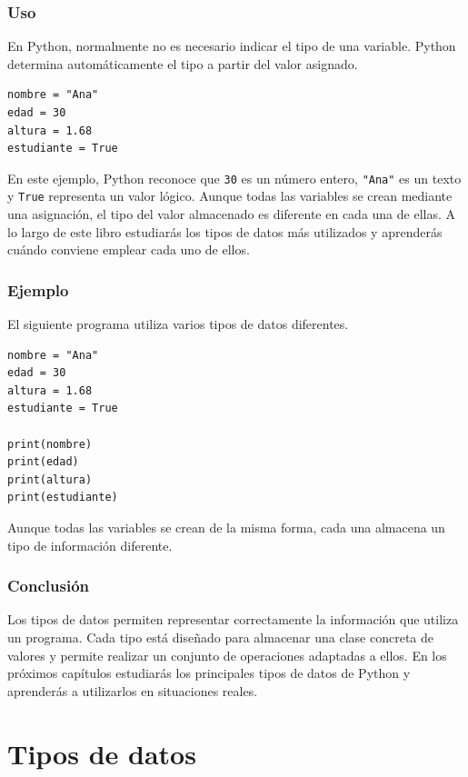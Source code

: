 \documentclass[11pt,a5paper,twoside]{book}
\begin{document}
\subsection{Uso}
En Python, normalmente no es necesario indicar el tipo de una variable. Python determina automáticamente el tipo a partir del valor asignado.


\begin{tcolorbox}
\scriptsize
 \begin{verbatim}
nombre = "Ana"
edad = 30
altura = 1.68
estudiante = True
\end{verbatim}
\end{tcolorbox}
En este ejemplo, Python reconoce que {\scriptsize \texttt{30}} es un número entero, {\scriptsize \texttt{"Ana"}} es un texto y {\scriptsize \texttt{True}} representa un valor lógico.
Aunque todas las variables se crean mediante una asignación, el tipo del valor almacenado es diferente en cada una de ellas.
A lo largo de este libro estudiarás los tipos de datos más utilizados y aprenderás cuándo conviene emplear cada uno de ellos.
\subsection{Ejemplo}
El siguiente programa utiliza varios tipos de datos diferentes.


\begin{tcolorbox}
\scriptsize
 \begin{verbatim}
nombre = "Ana"
edad = 30
altura = 1.68
estudiante = True

print(nombre)
print(edad)
print(altura)
print(estudiante)
\end{verbatim}
\end{tcolorbox}
Aunque todas las variables se crean de la misma forma, cada una almacena un tipo de información diferente.
\subsection{Conclusión}
Los tipos de datos permiten representar correctamente la información que utiliza un programa. Cada tipo está diseñado para almacenar una clase concreta de valores y permite realizar un conjunto de operaciones adaptadas a ellos.
En los próximos capítulos estudiarás los principales tipos de datos de Python y aprenderás a utilizarlos en situaciones reales.

\newpage


\chapter{Tipos de datos}
\end{document}
